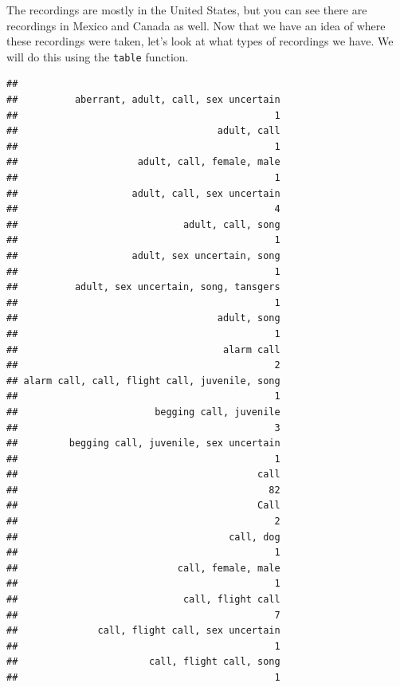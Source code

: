 \documentclass[
]{krantz}
\newenvironment{Shaded}{\begin{snugshade}}{\end{snugshade}}
\newcommand{\KeywordTok}[1]{\textcolor[rgb]{0.13,0.29,0.53}{\textbf{#1}}}
\newcommand{\NormalTok}[1]{#1}
\newcommand{\OperatorTok}[1]{\textcolor[rgb]{0.81,0.36,0.00}{\textbf{#1}}}
\begin{document}
The recordings are mostly in the United States, but you can see there are recordings in Mexico and Canada as well. Now that we have an idea of where these recordings were taken, let's look at what types of recordings we have. We will do this using the \texttt{table} function.

\begin{Shaded}
\end{Shaded}

\begin{verbatim}
## 
##          aberrant, adult, call, sex uncertain 
##                                             1 
##                                   adult, call 
##                                             1 
##                     adult, call, female, male 
##                                             1 
##                    adult, call, sex uncertain 
##                                             4 
##                             adult, call, song 
##                                             1 
##                    adult, sex uncertain, song 
##                                             1 
##          adult, sex uncertain, song, tansgers 
##                                             1 
##                                   adult, song 
##                                             1 
##                                    alarm call 
##                                             2 
## alarm call, call, flight call, juvenile, song 
##                                             1 
##                        begging call, juvenile 
##                                             3 
##         begging call, juvenile, sex uncertain 
##                                             1 
##                                          call 
##                                            82 
##                                          Call 
##                                             2 
##                                     call, dog 
##                                             1 
##                            call, female, male 
##                                             1 
##                             call, flight call 
##                                             7 
##              call, flight call, sex uncertain 
##                                             1 
##                       call, flight call, song 
##                                             1 

\end{verbatim}
\end{document}
